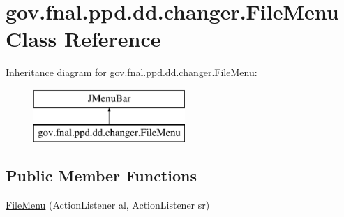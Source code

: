 \hypertarget{classgov_1_1fnal_1_1ppd_1_1dd_1_1changer_1_1FileMenu}{\section{gov.\-fnal.\-ppd.\-dd.\-changer.\-File\-Menu Class Reference}
\label{classgov_1_1fnal_1_1ppd_1_1dd_1_1changer_1_1FileMenu}
}
Inheritance diagram for gov.\-fnal.\-ppd.\-dd.\-changer.\-File\-Menu\-:\begin{figure}[H]
\begin{center}
\leavevmode
\includegraphics[height=2.000000cm]{classgov_1_1fnal_1_1ppd_1_1dd_1_1changer_1_1FileMenu}
\end{center}
\end{figure}
\subsection*{Public Member Functions}
\begin{DoxyCompactItemize}
\item 
\hyperlink{classgov_1_1fnal_1_1ppd_1_1dd_1_1changer_1_1FileMenu_af431678dddfefb6a2b928a97deeee6b2}{File\-Menu} (Action\-Listener al, Action\-Listener sr)
\end{DoxyCompactItemize}
